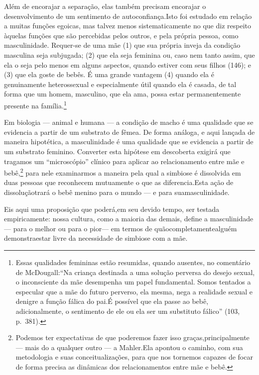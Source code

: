 Além de encorajar a separação, elas também precisam encorajar o
desenvolvimento de um sentimento de autoconfiança.\idxegoiauto[|(] Isto foi estudado em
relação a muitas funções egoicas, mas talvez menos sistematicamente no
que diz respeito àquelas funções que são percebidas pelos outros, e
pela própria pessoa, como masculinidade. Requer-se de uma mãe (1) que
sua própria inveja da condição masculina seja subjugada; (2) que ela
seja feminina\idxmascufem{} ou, caso nem tanto assim, que ela o seja pelo menos em
alguns aspectos, quando estiver com seus filhos (146); e (3) que ela
goste de bebês. É uma grande vantagem (4) quando ela é genuinamente
heterossexual e especialmente útil quando ela é casada, de tal forma
que um homem, masculino, que ela ama, possa estar permanentemente
presente na família.\footnote{ Essas qualidades femininas estão
resumidas, quando ausentes, no comentário de McDougall:\idxmcdoug[|nn]
``Na criança destinada a uma solução perversa do desejo
sexual, o inconsciente da mãe desempenha um papel fundamental. Somos
tentados a especular que a mãe do futuro perverso, ela mesma, nega a
realidade sexual e denigre a função fálica do pai.\idxmaesfalo[|nn] É possível que ela
passe ao bebê, adicionalmente, o sentimento de ele ou ela ser um
substituto fálico''\idxmaesfalo{} (103, p.~381).}

Em biologia --- animal e humana --- a condição de macho é uma
qualidade que se evidencia a partir de um substrato de fêmea. De forma
análoga, e aqui lançada de maneira hipotética, a masculinidade é uma
qualidade que se evidencia a partir de um substrato feminino. Converter
esta hipótese em descoberta exigirá que tragamos um
``microscópio'' clínico para aplicar ao
relacionamento entre mãe e bebê,\footnote{ Podemos ter expectativas de
que poderemos fazer isso graças,\idxmaessimb[|nn] principalmente --- mais do a
qualquer outro --- a Mahler.\idxmahle[|nn] Ela apontou o caminho, com sua
metodologia e suas conceitualizações, para que nos tornemos capazes de
focar de forma precisa as dinâmicas dos relacionamentos entre mãe e
bebê.} para nele examinarmos a maneira pela qual a simbiose é
dissolvida em duas pessoas que reconhecem mutuamente o que as
diferencia.\idxinfanego[|)] Esta ação de dissolução\idxegoi[|)] trará o bebê menino para o mundo
--- e para sua\idxegoiauto[|)] masculinidade.

Eis aqui uma proposição que poderá,\idxmaesproc[|)] em seu devido tempo, ser testada
empiricamente: nossa cultura, como a maioria das demais, define a
masculinidade --- para o melhor ou para o pior\idxtranse[|)] --- em termos de quão\idxangus[|)]
completamente\idxangusimb[|)] alguém demonstra\idxmaessimb[|)] estar livre da necessidade de simbiose
com a mãe.



